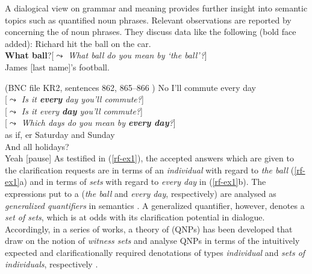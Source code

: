 \documentclass[output=paper
 	        ,biblatex
                ,babelshorthands
                ,newtxmath
                ,draftmode
                ,colorlinks, citecolor=brown
]{langscibook}
\begin{document}
A dialogical view on grammar and meaning provides further insight into semantic topics such as quantified noun phrases.
%
Relevant observations are reported by \citet{Purver:Ginzburg:2004} concerning the  of noun phrases.
%
They discuss data like the following (bold face added):
%
\ea \label{rf-ex1}
  \ea  {} Richard hit the ball on the car. \\
 \textbf{What ball}?\hspace*{0.25cm}[\emph{$\leadsto$ What ball do you mean by  `the ball'?}] \\
 James [last name]'s football. \par\smallskip
\hfill (BNC file KR2, sentences 862, 865--866 )
  \ex {} No I'll commute every day \\
 [\emph{$\leadsto$ Is it \textbf{every} day you'll commute?}]\\
 [\emph{$\leadsto$ Is it every \textbf{day} you'll commute?}]\\
 [\emph{$\leadsto$ Which days do you mean by \textbf{every day}?}]\\
 as if, er Saturday and Sunday \\
 And all holidays? \\
 Yeah [pause]
  \z
\z
%
As testified in (\ref{rf-ex1}), the accepted answers which are given to the clarification requests are in terms of an \emph{individual} with regard to \textit{the ball} (\ref{rf-ex1}a) and in terms of \emph{sets} with regard to \textit{every day} in (\ref{rf-ex1}b).
%
The expressions put to a  (\textit{the ball} and \textit{every day}, respectively) are analysed as \emph{generalized quantifiers} in semantics \citep{montague73}.
%
A generalized quantifier, however, denotes a \emph{set of sets}, which is at odds with its clarification potential in dialogue. 
%
Accordingly, in a series of works, a theory of  (QNPs) has been developed that draw on the notion of \emph{witness sets} \citep[]{Barwise:Cooper:1981} and analyse QNPs in terms of the intuitively expected and clarificationally required denotations of types \emph{individual} and \emph{sets of individuals}, respectively  \citep{Purver:Ginzburg:2004,Ginzburg:Purver:2012,Ginzburg:2012,Cooper:2013,Luecking:Ginzburg:2018,Cooper:ms}. 
%
\end{document}
